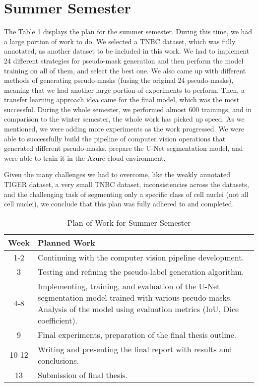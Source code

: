 \section{Summer Semester}
The Table \ref{tab:summer_plan} displays the plan for the summer semester. During this time, we had a large portion of work to do. We selected a TNBC dataset, which was fully annotated, as another dataset to be included in this work. We had to implement 24 different strategies for pseudo-mask generation and then perform the model training on all of them, and select the best one. We also came up with different methods of generating pseudo-masks (fusing the original 24 pseudo-masks), meaning that we had another large portion of experiments to perform. Then, a transfer learning approach idea came for the final model, which was the most successful. During the whole semester, we performed almost 600 trainings, and in comparison to the winter semester, the whole work has picked up speed. As we mentioned, we were adding more experiments as the work progressed. We were able to successfully build the pipeline of computer vision operations that generated different pseudo-masks, prepare the U-Net segmentation model, and were able to train it in the Azure cloud environment. 

Given the many challenges we had to overcome, like the weakly annotated TIGER dataset, a very small TNBC dataset, inconsistencies across the datasets, and the challenging task of segmenting only a specific class of cell nuclei (not all cell nuclei), we conclude that this plan was fully adhered to and completed.

\begin{table}[h!]
\centering
\begin{tabular}{|c|p{12.5cm}|}
\hline
\textbf{Week} & \textbf{Planned Work} \\ 
\hline
\hline
1-2 & Continuing with the computer vision pipeline development. \\
\hline
3 & Testing and refining the pseudo-label generation algorithm. \\ 
\hline
4-8 & Implementing, training, and evaluation of the U-Net segmentation model trained with various pseudo-masks. Analysis of the model using evaluation metrics (IoU, Dice coefficient). \\ 
\hline
9 & Final experiments, preparation of the final thesis outline. \\ 
\hline
10-12 & Writing and presenting the final report with results and conclusions. \\ 
\hline
13 & Submission of final thesis. \\ 
\hline
\end{tabular}
\caption{Plan of Work for Summer Semester}
\label{tab:summer_plan}
\end{table}

